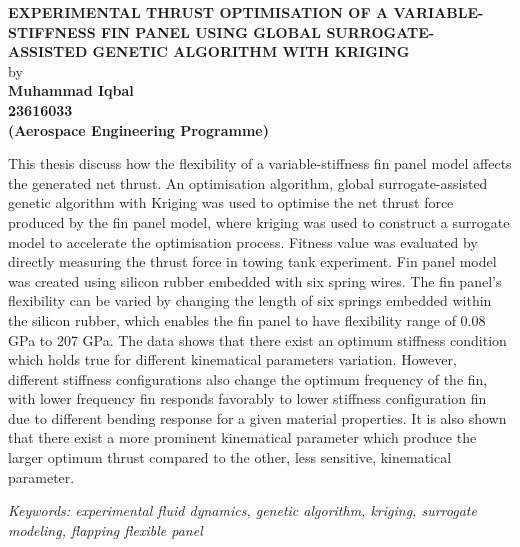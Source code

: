 \begin{center}{
    \textbf{EXPERIMENTAL THRUST OPTIMISATION OF A VARIABLE-STIFFNESS FIN PANEL USING GLOBAL SURROGATE-ASSISTED GENETIC ALGORITHM WITH KRIGING}\\
    by\\
    \textbf{
        Muhammad Iqbal\\
        23616033\\
        (Aerospace Engineering Programme)
    }
}
\end{center}
This thesis discuss how the flexibility of a variable-stiffness fin panel model affects the generated net thrust. An optimisation algorithm, global surrogate-assisted genetic algorithm with Kriging was used to optimise the net thrust force produced by the fin panel model, where kriging was used to construct a surrogate model to accelerate the optimisation process. Fitness value was evaluated by directly measuring the thrust force in towing tank experiment. Fin panel model was created using silicon rubber embedded with six spring wires. The fin panel's flexibility can be varied by changing the length of six springs embedded within the silicon rubber, which enables the fin panel to have flexibility range of 0.08 GPa to 207 GPa. The data shows that there exist an optimum stiffness condition which holds true for different kinematical parameters variation. However, different stiffness configurations also change the optimum frequency of the fin, with lower frequency fin responds favorably to lower stiffness configuration fin due to different bending response for a given material properties. It is also shown that there exist a more prominent kinematical parameter which produce the larger optimum thrust compared to the other, less sensitive, kinematical parameter.\par
\textit{Keywords: experimental fluid dynamics, genetic algorithm, kriging, surrogate modeling, flapping flexible panel}
